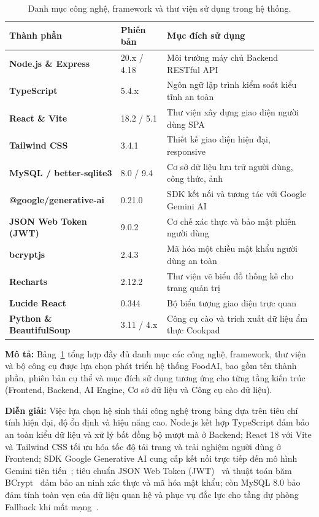 \begin{table}[H]
\centering
\caption{Danh mục công nghệ, framework và thư viện sử dụng trong hệ thống.}
\label{tab:congcu}
\begin{tabularx}{\textwidth}{@{}>{\bfseries\color{daunavy}}p{4.2cm} >{\color{daumaroon}}p{2.2cm} >{\raggedright\arraybackslash}X@{}}
\toprule
\rowcolor{gray100}\bfseries\color{daunavy}Thành phần & \bfseries\color{daumaroon}Phiên bản & \bfseries\color{daunavy}Mục đích sử dụng \\
\midrule
Node.js \& Express      & 20.x / 4.18  & Môi trường máy chủ Backend RESTful API \\
TypeScript              & 5.4.x        & Ngôn ngữ lập trình kiểm soát kiểu tĩnh an toàn \\
React \& Vite           & 18.2 / 5.1   & Thư viện xây dựng giao diện người dùng SPA \\
Tailwind CSS            & 3.4.1        & Thiết kế giao diện hiện đại, responsive \\
MySQL / better-sqlite3  & 8.0 / 9.4    & Cơ sở dữ liệu lưu trữ người dùng, công thức, ảnh \\
@google/generative-ai   & 0.21.0       & SDK kết nối và tương tác với Google Gemini AI \\
JSON Web Token (JWT)    & 9.0.2        & Cơ chế xác thực và bảo mật phiên người dùng \\
bcryptjs                & 2.4.3        & Mã hóa một chiều mật khẩu người dùng an toàn \\
Recharts                & 2.12.2       & Thư viện vẽ biểu đồ thống kê cho trang quản trị \\
Lucide React            & 0.344        & Bộ biểu tượng giao diện trực quan \\
Python \& BeautifulSoup & 3.11 / 4.x   & Công cụ cào và trích xuất dữ liệu ẩm thực Cookpad \\
\bottomrule
\end{tabularx}
\end{table}

\noindent\textbf{Mô tả:} Bảng~\ref{tab:congcu} tổng hợp đầy đủ danh mục các công nghệ, framework, thư viện và bộ công cụ được lựa chọn phát triển hệ thống FoodAI, bao gồm tên thành phần, phiên bản cụ thể và mục đích sử dụng tương ứng cho từng tầng kiến trúc (Frontend, Backend, AI Engine, Cơ sở dữ liệu và Công cụ cào dữ liệu).

\noindent\textbf{Diễn giải:} Việc lựa chọn hệ sinh thái công nghệ trong bảng dựa trên tiêu chí tính hiện đại, độ ổn định và hiệu năng cao. Node.js kết hợp TypeScript đảm bảo an toàn kiểu dữ liệu và xử lý bất đồng bộ mượt mà ở Backend; React 18 với Vite và Tailwind CSS tối ưu hóa tốc độ tải trang và trải nghiệm người dùng ở Frontend; SDK Google Generative AI cung cấp kết nối trực tiếp đến mô hình Gemini tiên tiến~\cite{GoogleGenAISDK}; tiêu chuẩn JSON Web Token (JWT)~\cite{Jones2015JWT} và thuật toán băm BCrypt~\cite{Provos1999Bcrypt} đảm bảo an ninh xác thực và mã hóa mật khẩu; còn MySQL 8.0 bảo đảm tính toàn vẹn của dữ liệu quan hệ và phục vụ đắc lực cho tầng dự phòng Fallback khi mất mạng~\cite{NodeJSOfficial, ExpressOfficial, TypeScriptOfficial, ReactOfficial, MySQLManual, Cookpad2024, PexelsAPI2024}.

